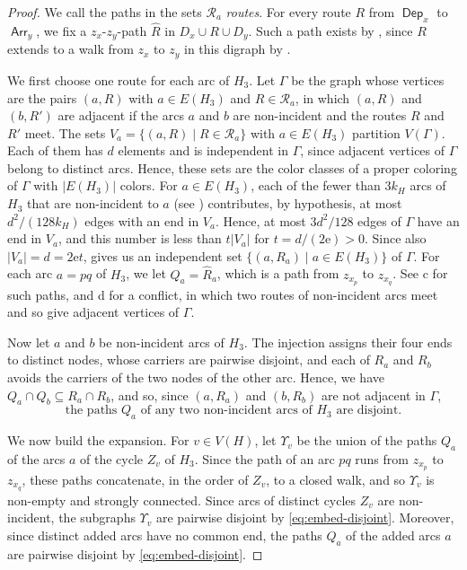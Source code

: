 \documentclass[fontsize=12pt,leading=14pt]{fullpaper}
\DeclareMathOperator{\Arr}{\mathsf{Arr}}
\DeclareMathOperator{\Dep}{\mathsf{Dep}}
\newcommand{\Rcal}{\mathcal{R}}
\begin{document}
\begin{proof}
  We call the paths in the sets $\Rcal_a$ \emph{routes}.
  For every route $R$ from $\Dep_x$ to $\Arr_y$, we fix a $z_x$-$z_y$-path $\widehat R$ in $D_x\cup R\cup D_y$.
  Such a path exists by , since $R$ extends to a walk from $z_x$ to $z_y$ in this digraph by .

  We first choose one route for each arc of $H_3$.
  Let $\Gamma$ be the graph whose vertices are the pairs $(a,R)$ with $a\in E(H_3)$ and $R\in\Rcal_a$, in which $(a,R)$ and $(b,R')$ are adjacent if the arcs $a$ and $b$ are non-incident and the routes $R$ and $R'$ meet.
  The sets $V_a=\{(a,R)\mid R\in\Rcal_a\}$ with $a\in E(H_3)$ partition $V(\Gamma)$.
  Each of them has $d$ elements and is independent in $\Gamma$, since adjacent vertices of $\Gamma$ belong to distinct arcs.
  Hence, these sets are the color classes of a proper coloring of $\Gamma$ with $|E(H_3)|$ colors.
  For $a\in E(H_3)$, each of the fewer than $3k_H$ arcs of $H_3$ that are non-incident to $a$ (see ) contributes, by hypothesis, at most $d^2/(128k_H)$ edges with an end in $V_a$.
  Hence, at most $3d^2/128$ edges of $\Gamma$ have an end in $V_a$, and this number is less than $t|V_a|$ for $t=d/(2\mathrm e)>0$.
  Since also $|V_a|=d=2\mathrm et$,  gives us an independent set $\{(a,R_a)\mid a\in E(H_3)\}$ of $\Gamma$.
  For each arc $a=pq$ of $H_3$, we let $Q_a=\widehat R_a$, which is a path from $z_{x_p}$ to $z_{x_q}$.
  See c for such paths, and d for a conflict, in which two routes of non-incident arcs meet and so give adjacent vertices of $\Gamma$.

  Now let $a$ and $b$ be non-incident arcs of $H_3$.
  The injection assigns their four ends to distinct nodes, whose carriers are pairwise disjoint, and each of $R_a$ and $R_b$ avoids the carriers of the two nodes of the other arc.
  Hence, we have $Q_a\cap Q_b\subseteq R_a\cap R_b$, and so, since $(a,R_a)$ and $(b,R_b)$ are not adjacent in $\Gamma$,
  \begin{equation}\label{eq:embed-disjoint}
    \text{the paths $Q_a$ of any two non-incident arcs of $H_3$ are disjoint.}
  \end{equation}

  We now build the expansion.
  For $v\in V(H)$, let $\Upsilon_v$ be the union of the paths $Q_a$ of the arcs $a$ of the cycle $Z_v$ of $H_3$.
  Since the path of an arc $pq$ runs from $z_{x_p}$ to $z_{x_q}$, these paths concatenate, in the order of $Z_v$, to a closed walk, and so $\Upsilon_v$ is non-empty and strongly connected.
  Since arcs of distinct cycles $Z_v$ are non-incident, the subgraphs $\Upsilon_v$ are pairwise disjoint by \eqref{eq:embed-disjoint}.
  Moreover, since distinct added arcs have no common end, the paths $Q_a$ of the added arcs $a$ are pairwise disjoint by \eqref{eq:embed-disjoint}.


\end{proof}
\end{document}
